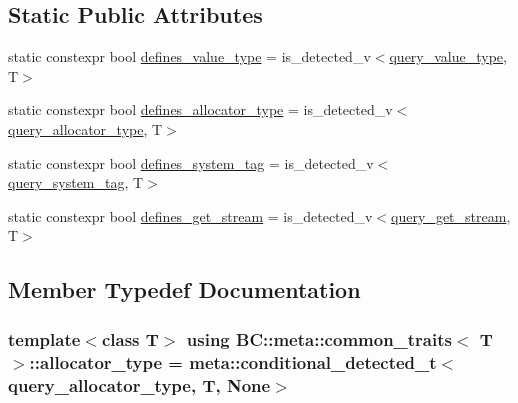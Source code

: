\subsection*{Static Public Attributes}
\begin{DoxyCompactItemize}
\item 
static constexpr bool \hyperlink{structBC_1_1meta_1_1common__traits_a22b2e5a2dcc983c109232f45421f3904}{defines\+\_\+value\+\_\+type} = is\+\_\+detected\+\_\+v$<$\hyperlink{namespaceBC_1_1meta_a36503419befa65fc6e75a98b507337d7}{query\+\_\+value\+\_\+type}, T$>$
\item 
static constexpr bool \hyperlink{structBC_1_1meta_1_1common__traits_a6b3bfa93ba666bf3be2714c15c5036da}{defines\+\_\+allocator\+\_\+type} = is\+\_\+detected\+\_\+v$<$\hyperlink{namespaceBC_1_1meta_ab8436259bffb6e3c72b402744e6dc707}{query\+\_\+allocator\+\_\+type}, T$>$
\item 
static constexpr bool \hyperlink{structBC_1_1meta_1_1common__traits_a15dcfd094301c557d563188baa50888d}{defines\+\_\+system\+\_\+tag} = is\+\_\+detected\+\_\+v$<$\hyperlink{namespaceBC_1_1meta_a4c0dfe841ff90bea709f1289cb3718ea}{query\+\_\+system\+\_\+tag}, T$>$
\item 
static constexpr bool \hyperlink{structBC_1_1meta_1_1common__traits_a1f6ad19ea07b06a8f2332629eba0587d}{defines\+\_\+get\+\_\+stream} = is\+\_\+detected\+\_\+v$<$\hyperlink{namespaceBC_1_1meta_a44d5ad654ba538cd0f7c697a1693fc7f}{query\+\_\+get\+\_\+stream}, T$>$
\end{DoxyCompactItemize}


\subsection{Member Typedef Documentation}
\subsubsection[{\texorpdfstring{allocator\+\_\+type}{allocator_type}}]{\setlength{\rightskip}{0pt plus 5cm}template$<$class T$>$ using {\bf B\+C\+::meta\+::common\+\_\+traits}$<$ T $>$\+::{\bf allocator\+\_\+type} =  {\bf meta\+::conditional\+\_\+detected\+\_\+t}$<${\bf query\+\_\+allocator\+\_\+type}, T, None$>$}\hypertarget{structBC_1_1meta_1_1common__traits_a73f9e44fada565af730b3d70fbc355d2}{}\label{structBC_1_1meta_1_1common__traits_a73f9e44fada565af730b3d70fbc355d2}

